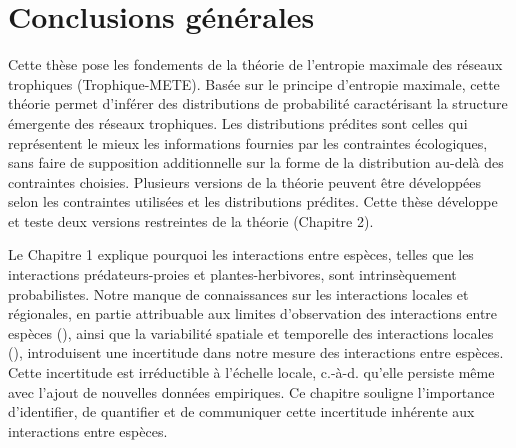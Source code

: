 
\francais   
\chapter*{Conclusions générales}


Cette thèse pose les fondements de la théorie de l'entropie maximale des réseaux
trophiques (Trophique-METE). Basée sur le principe d'entropie maximale, cette
théorie permet d'inférer des distributions de probabilité caractérisant la
structure émergente des réseaux trophiques. Les distributions prédites sont
celles qui représentent le mieux les informations fournies par les contraintes
écologiques, sans faire de supposition additionnelle sur la forme de la
distribution au-delà des contraintes choisies. Plusieurs versions de la théorie
peuvent être développées selon les contraintes utilisées et les distributions
prédites. Cette thèse développe et teste deux versions restreintes de la théorie
(Chapitre 2). 

Le Chapitre 1 explique pourquoi les interactions entre espèces, telles que les
interactions prédateurs-proies et plantes-herbivores, sont intrinsèquement
probabilistes. Notre manque de connaissances sur les interactions locales et
régionales, en partie attribuable aux limites d'observation des interactions
entre espèces (\cite{Jordano2016Sampling}), ainsi que la variabilité spatiale et
temporelle des interactions locales (\cite{Poisot2015Species}), introduisent une
incertitude dans notre mesure des interactions entre espèces. Cette incertitude
est irréductible à l'échelle locale, c.-à-d. qu'elle persiste même avec l'ajout
de nouvelles données empiriques. Ce chapitre souligne l'importance d'identifier,
de quantifier et de communiquer cette incertitude inhérente aux interactions
entre espèces. 

